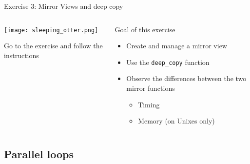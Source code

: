 \documentclass[
    aspectratio=169,
]{beamer}
\begin{document}

\begin{exerciseframe}{Exercise 3: Mirror Views and deep copy}
    \begin{columns}
        \begin{column}{0.5\linewidth}
            \begin{center}
                \texttt{[image: sleeping\_otter.png]}
            \end{center}

            Go to the exercise  and follow the instructions
        \end{column}
        \begin{column}{0.5\linewidth}
            \begin{block}{Goal of this exercise}
                \begin{itemize}
                    \item Create and manage a mirror view
                    \item Use the \texttt{deep\_copy} function
                    \item Observe the differences between the two mirror functions
                    \begin{itemize}
                        \item Timing
                        \item Memory (on Unixes only)
                    \end{itemize}
                \end{itemize}
            \end{block}
        \end{column}
    \end{columns}
\end{exerciseframe}


\subsection{Parallel loops}

\end{document}
